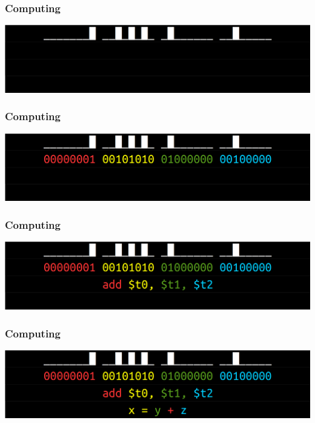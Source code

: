 \documentclass[11pt]{beamer}
\begin{document}
\begin{frame}[fragile]
  \frametitle{Computing}

  \includegraphics[width=\textwidth]{./img/assembler-1.png}
\end{frame}

\begin{frame}[fragile]
  \frametitle{Computing}

  \includegraphics[width=\textwidth]{./img/assembler-2.png}
\end{frame}

\begin{frame}[fragile]
  \frametitle{Computing}

  \includegraphics[width=\textwidth]{./img/assembler-3.png}
\end{frame}

\begin{frame}[fragile]
  \frametitle{Computing}

  \includegraphics[width=\textwidth]{./img/assembler-4.png}
\end{frame}
\end{document}
